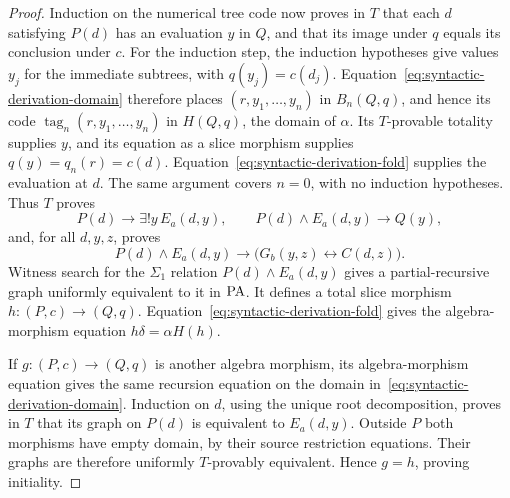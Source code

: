 \begin{proof}
Induction on the numerical tree code now proves in $T$ that
each $d$ satisfying $P(d)$ has an evaluation $y$ in $Q$, and
that its image under $q$ equals its conclusion under $c$.
For the induction step, the induction hypotheses give values
$y_j$ for the immediate subtrees, with
$q(y_j)=c(d_j)$.  Equation~\eqref{eq:syntactic-derivation-domain}
therefore places $(r,y_1,\ldots,y_n)$ in $B_n(Q,q)$, and hence
its code $\operatorname{tag}_n(r,y_1,\ldots,y_n)$ in $H(Q,q)$,
the domain of $\alpha$. Its $T$-provable totality supplies
$y$, and its equation as a slice morphism supplies
$q(y)=q_n(r)=c(d)$.  Equation~\eqref{eq:syntactic-derivation-fold}
supplies the evaluation at $d$.  The same argument covers
$n=0$, with no induction hypotheses.
Thus $T$ proves
\[
 P(d)\longrightarrow\exists!y\,E_a(d,y),
 \qquad
 P(d)\land E_a(d,y)\longrightarrow Q(y),
\]
and, for all $d,y,z$, proves
\[
 P(d)\land E_a(d,y)
 \longrightarrow\bigl(G_b(y,z)\leftrightarrow C(d,z)\bigr).
\]
Witness search for the $\Sigma_1$ relation
$P(d)\land E_a(d,y)$ gives a partial-recursive graph uniformly
equivalent to it in $\mathrm{PA}$.  It defines a total slice morphism
$h:(P,c)\to(Q,q)$.  Equation~\eqref{eq:syntactic-derivation-fold}
gives the algebra-morphism equation
$h\delta=\alpha H(h)$.

If $g:(P,c)\to(Q,q)$ is another algebra morphism, its
algebra-morphism equation gives the same recursion equation
on the domain in~\eqref{eq:syntactic-derivation-domain}.
Induction on $d$, using the unique root decomposition, proves
in $T$ that its graph on $P(d)$ is equivalent to $E_a(d,y)$.
Outside $P$ both morphisms have empty domain, by their source
restriction equations.  Their graphs are therefore uniformly
$T$-provably equivalent.  Hence $g=h$, proving initiality.
\end{proof}


